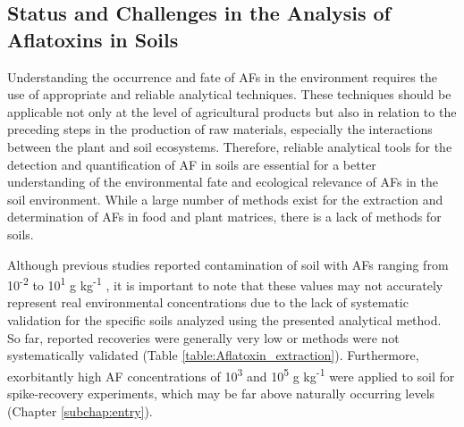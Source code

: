 \subsection{Status and Challenges in the Analysis of Aflatoxins in Soils} \label{subchap:analysis}

Understanding the occurrence and fate of AFs in the environment requires the use of appropriate and reliable analytical techniques. These techniques should be applicable not only at the level of agricultural products but also in relation to the preceding steps in the production of raw materials, especially the interactions between the plant and soil ecosystems. Therefore, reliable analytical tools for the detection and quantification of AF in soils are essential for a better understanding of the environmental fate and ecological relevance of AFs in the soil environment. While a large number of methods exist for the extraction and determination of AFs in food and plant matrices, there is a lack of methods for soils. 


Although previous studies reported contamination of soil with AFs ranging from 10\textsuperscript{-2} to 10\textsuperscript{1} \textmu g kg\textsuperscript{-1} \citep{accinelli2008aspergillus}, it is important to note that these values may not accurately represent real environmental concentrations due to the lack of systematic validation for the specific soils analyzed using the presented analytical method. So far, reported recoveries were generally very low or methods were not systematically validated (Table \ref{table:Aflatoxin_extraction}). Furthermore, exorbitantly high AF concentrations of 10\textsuperscript{3} and 10\textsuperscript{5} \textmu g kg\textsuperscript{-1} were applied to soil for spike-recovery experiments, which may be far above naturally occurring levels (Chapter \ref{subchap:entry}). 

 



